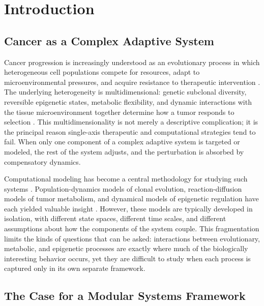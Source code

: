 \documentclass[12pt,a4paper]{article}
\begin{document}
\thispagestyle{empty}

\newpage
\pagestyle{mainstyle}
\setcounter{page}{1}

\section{Introduction}

\subsection{Cancer as a Complex Adaptive System}

Cancer progression is increasingly understood as an evolutionary process in which heterogeneous cell populations compete for resources, adapt to microenvironmental pressures, and acquire resistance to therapeutic intervention \citep{mcgranahan2017,beerenwinkel2015}. The underlying heterogeneity is multidimensional: genetic subclonal diversity, reversible epigenetic states, metabolic flexibility, and dynamic interactions with the tissue microenvironment together determine how a tumor responds to selection \citep{hanahan2022,baylin2016,pavlova2022}. This multidimensionality is not merely a descriptive complication; it is the principal reason single-axis therapeutic and computational strategies tend to fail. When only one component of a complex adaptive system is targeted or modeled, the rest of the system adjusts, and the perturbation is absorbed by compensatory dynamics.

Computational modeling has become a central methodology for studying such systems \citep{kitano2002}. Population-dynamics models of clonal evolution, reaction-diffusion models of tumor metabolism, and dynamical models of epigenetic regulation have each yielded valuable insight \citep{altrock2015,markert2015}. However, these models are typically developed in isolation, with different state spaces, different time scales, and different assumptions about how the components of the system couple. This fragmentation limits the kinds of questions that can be asked: interactions between evolutionary, metabolic, and epigenetic processes are exactly where much of the biologically interesting behavior occurs, yet they are difficult to study when each process is captured only in its own separate framework.

\subsection{The Case for a Modular Systems Framework}
\end{document}
